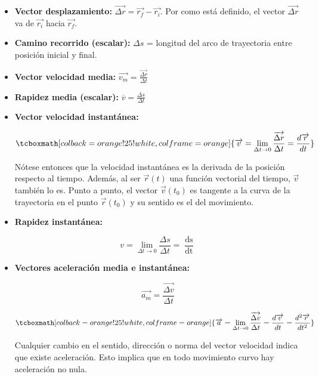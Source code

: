 \documentclass{article}
\begin{document}
\begin{itemize}
\item \textbf{Vector desplazamiento:} $\overrightarrow{ \Delta r } = \overrightarrow{r_f} - \overrightarrow{r_i}$. Por como está definido, el vector $\overrightarrow{\Delta r}$ va de $\overrightarrow{r_i}$ hacia $\overrightarrow{r_f}$.
\item \textbf{Camino recorrido (escalar):}  $\Delta s$ = longitud del arco de trayectoria entre posición inicial y final.
\item \textbf{Vector velocidad media:} $\overrightarrow{v_m} = \frac{\overrightarrow{\Delta r}}{\Delta t}$
\item \textbf{Rapidez media (escalar):} $\overline{v} = \frac{\Delta s}{\Delta t}$
\item \textbf{Vector velocidad instantánea:}

\begin{equation}
\tcboxmath[colback=orange!25!white,colframe=orange]{
\overrightarrow{v} = \lim_{\Delta t \rightarrow 0} \frac{ \mathop{\overrightarrow{\Delta r}} }{\Delta t} = \frac{d\overrightarrow{r}}{\mathop{dt}}
}
\end{equation}

Nótese entonces que la velocidad instantánea es la derivada de la posición respecto al tiempo. Además, al ser $\overrightarrow{r}(t)$ una función vectorial del tiempo, $\overrightarrow{v}$ también lo es. Punto a punto, el vector $\overrightarrow{v}(t_0)$ es tangente a la curva de la trayectoria en el punto $\overrightarrow{r}(t_0)$ y su sentido es el del movimiento.
\item \textbf{Rapidez instantánea:}

\begin{equation}
v = \lim_{\Delta t \rightarrow 0} \frac{\Delta s}{\Delta t} = \frac{\mathop{ds}}{\mathop{dt}}
\end{equation}

\item \textbf{Vectores aceleración media e instantánea:}

\begin{equation}
\overrightarrow{a_m} = \frac{ \overrightarrow{ \Delta v } }{ \Delta t }
\end{equation}

\begin{equation}
\tcboxmath[colback=orange!25!white,colframe=orange]{
\overrightarrow{a} = \lim_{\Delta t \rightarrow 0} \frac{ \overrightarrow{ \Delta v } }{\Delta t} = \frac{ \mathop{d\overrightarrow{v}} }{ \mathop{dt} } = \frac{ \mathop{ d^2 \overrightarrow{r} } }{ \mathop{ dt^2 } }
}
\end{equation}

Cualquier cambio en el sentido, dirección o norma del vector velocidad indica que existe aceleración. Esto implica que en todo movimiento curvo hay aceleración no nula.

\end{itemize}
\end{document}
